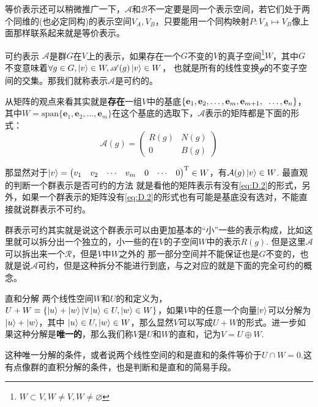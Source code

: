 等价表示还可以稍微推广一下，$\mathscr{A}$和$\mathscr{B}$不一定要是同一个表示空间，若它们处于两个同维的(也必定同构)的表示空间$V_A,V_B$，只要能用一个同构映射$P:V_A\mapsto V_B$像上面那样联系起来就是等价表示。

\begin{define}{可约表示}
    $\mathscr{A}$是群$G$在$V$上的表示，如果存在一个$G$不变的$V$的真子空间\footnote[1]{$W\subset V,W\neq V,W\neq \varnothing$}$W$，其中$G$不变意味着$\forall g\in G, \ket{v}\in W,\mathscr{A}(g)\ket{v}\in W$，
    也就是所有的线性变换$\mathscr{g}$的不变子空间的交集。那我们就称表示$\mathscr{A}$是可约的。
\end{define}
从矩阵的观点来看其实就是\textbf{存在}一组$V$中的基底$\left\{\mathbf{e}_1,\mathbf{e}_2,\ldots,\mathbf{e}_m,\mathbf{e}_{m+1},\right.\\\left.\ldots,\mathbf{e}_n\right\}$，其中$W=\mathrm{span}\{\mathbf{e}_1,\mathbf{e}_2,\ldots,\mathbf{e}_m\}$在这个基底的选取下，$\mathscr{A}$表示的矩阵都是下面的形式：
\begin{equation}
    \label{eq:D.2}
    \mathcal{A}(g)=\begin{pmatrix}
    R(g) &N(g) \\
     {0} & B(g)
   \end{pmatrix}
\end{equation}

那显然对于$\ket{v}=\begin{pmatrix}v_1&v_2&\cdots&v_m&0&\cdots&0\end{pmatrix}^{\mathrm{T}}\in W$，有$\mathcal{A}(g)\ket{v}\in W$. 最直观的判断一个群表示是否可约的方法
就是看他的矩阵表示有没有\ref{eq:D.2}的形式，另外，如果一个群表示的矩阵没有\ref{eq:D.2}的形式也有可能是基底没有选对，不能直接就说群表示不可约。

群表示可约其实就是说这个群表示可以由更加基本的“小”一些的表示构成，比如这里就可以拆分出一个独立的，小一些的在$V$的子空间$W$中的表示$R(g)$. 但是这里$\mathscr{A}$可以拆出来一个$\mathscr{R}$，但是$V$中$W$之外的
那一部分空间并不能保证也是$G$不变的，也就是说$\mathscr{A}$可约，但是这种拆分不能进行到底，与之对应的就是下面的完全可约的概念。
\begin{define}{直和分解}
    两个线性空间$W$和$U$的和定义为，$U+W\equiv \{\ket{u}+\ket{w}|\forall \ket{u}\in U,\ket{w}\in W\}$，如果$V$中的任意一个向量$\ket{v}$可以分解为$\ket{u}+\ket{w}$，其中
    $\ket{u}\in U,\ket{w}\in W$，那么显然$V$可以写成$U+W$的形式。进一步如果这种分解是\textbf{唯一的}，那么我们称$V$是$U$和$W$的直和，记为$V=U\oplus W$.

    \setlength\parindent{2em}这种唯一分解的条件，或者说两个线性空间的和是直和的条件等价于$U\cap W={0}$.这有点像群的直积分解的条件，也是判断和是直和的简易手段。
\end{define}

